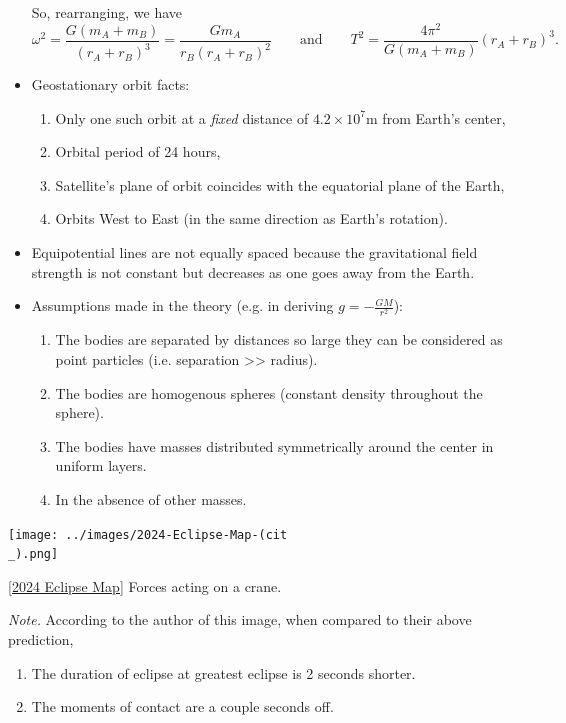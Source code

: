 \documentclass[oneside]{book}
\begin{document}
\begin{itemize}[label=\(\square\)]
So, rearranging, we have
\[\omega^2=\frac{G(m_A+m_B)}{(r_A+r_B)^3}=\frac{Gm_A}{r_B(r_A+r_B)^2} \qquad\text{and}\qquad T^2=\frac{4\pi^2}{G(m_A+m_B)}(r_A+r_B)^3.\]
\item Geostationary orbit facts:
\begin{enumerate}
    \item Only one such orbit at a \emph{fixed} distance of \(4.2\times10^7\text{m}\) from Earth's center,
    \item Orbital period of 24 hours,
    \item Satellite's plane of orbit coincides with the equatorial plane of the Earth,
    \item Orbits West to East (in the same direction as Earth's rotation). 
\end{enumerate}
\item Equipotential lines are not equally spaced because the gravitational field strength is not constant but decreases as one goes away from the Earth.
\item Assumptions made in the theory (e.g. in deriving \(g=-\frac{GM}{r^2}\)):
\begin{enumerate}
    \item The bodies are separated by distances so large they can be considered as point particles (i.e. separation >> radius).
    \item The bodies are homogenous spheres (constant density throughout the sphere).
    \item The bodies have masses distributed symmetrically around the center in uniform layers.
    \item In the absence of other masses.
\end{enumerate}
\end{itemize}
\begin{center}
    \texttt{[image: ../images/2024-Eclipse-Map-(cit\\\_).png]}
    \captionsetup{type=figure}
    \caption[figure]{\ref{2024 Eclipse Map} Forces acting on a crane.}
\end{center}
\emph{Note.} According to the author of this image, when compared to their above prediction,
\begin{enumerate}
    \item The duration of eclipse at greatest eclipse is 2 seconds shorter.
    \item The moments of contact are a couple seconds off.
\end{enumerate}
\end{document}
